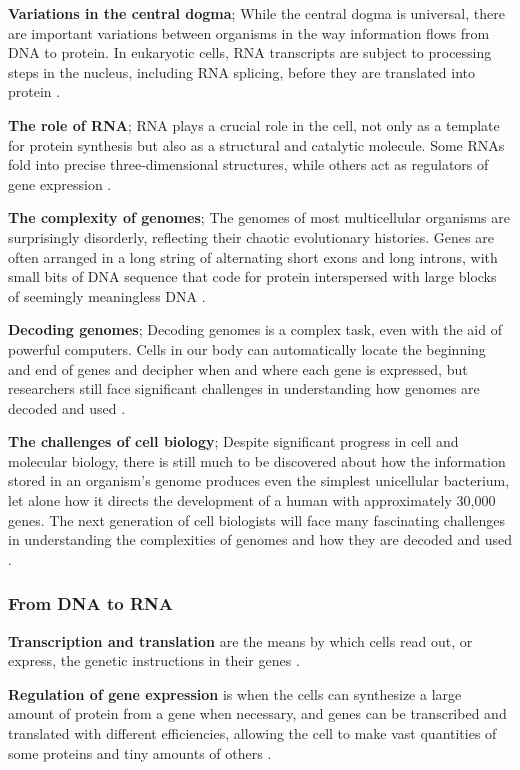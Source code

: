 \textbf{Variations in the central dogma};
While the central dogma is universal, there are important variations between organisms in the way information flows from DNA to protein. In eukaryotic cells, RNA transcripts are subject to processing steps in the nucleus, including RNA splicing, before they are translated into protein \cite*{L1-Chapter6}.

\textbf{The role of RNA};
RNA plays a crucial role in the cell, not only as a template for protein synthesis but also as a structural and catalytic molecule. Some RNAs fold into precise three-dimensional structures, while others act as regulators of gene expression \cite*{L1-Chapter6}.

\textbf{The complexity of genomes};
The genomes of most multicellular organisms are surprisingly disorderly, reflecting their chaotic evolutionary histories. Genes are often arranged in a long string of alternating short exons and long introns, with small bits of DNA sequence that code for protein interspersed with large blocks of seemingly meaningless DNA \cite*{L1-Chapter6}.

\textbf{Decoding genomes};
Decoding genomes is a complex task, even with the aid of powerful computers. Cells in our body can automatically locate the beginning and end of genes and decipher when and where each gene is expressed, but researchers still face significant challenges in understanding how genomes are decoded and used \cite*{L1-Chapter6}.

\textbf{The challenges of cell biology};
Despite significant progress in cell and molecular biology, there is still much to be discovered about how the information stored in an organism's genome produces even the simplest unicellular bacterium, let alone how it directs the development of a human with approximately 30,000 genes. The next generation of cell biologists will face many fascinating challenges in understanding the complexities of genomes and how they are decoded and used \cite*{L1-Chapter6}.

\subsubsection{From DNA to RNA}
\textbf{Transcription and translation} are the means by which cells read out, or express, the genetic instructions in their genes \cite*{L1-Chapter6}.

\textbf{Regulation of gene expression} is when the cells can synthesize a large amount of protein from a gene when necessary, and genes can be transcribed and translated with different efficiencies, allowing the cell to make vast quantities of some proteins and tiny amounts of others \cite*{L1-Chapter6}.

